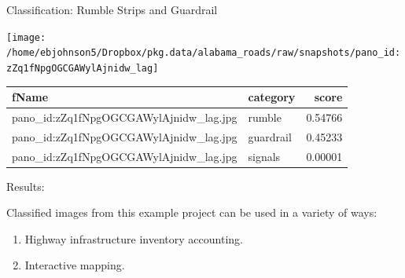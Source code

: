 \documentclass[ignorenonframetext,]{beamer}
\providecommand{\tightlist}{%
  \setlength{\itemsep}{0pt}\setlength{\parskip}{0pt}}
\begin{document}
\begin{frame}{Classification: Rumble Strips and Guardrail}

\begin{center}\texttt{[image: /home/ebjohnson5/Dropbox/pkg.data/alabama\_roads/raw/snapshots/pano\_id:zZq1fNpgOGCGAWylAjnidw\_lag]} \end{center}

\begin{table}[H]
\centering\begingroup\fontsize{6}{8}\selectfont

\begin{tabular}{l|l|r}
\hline
fName & category & score\\
\hline
pano\_id:zZq1fNpgOGCGAWylAjnidw\_lag.jpg & rumble & 0.54766\\
\hline
pano\_id:zZq1fNpgOGCGAWylAjnidw\_lag.jpg & guardrail & 0.45233\\
\hline
pano\_id:zZq1fNpgOGCGAWylAjnidw\_lag.jpg & signals & 0.00001\\
\hline
\end{tabular}\endgroup{}
\end{table}

\end{frame}

\begin{frame}{Results:}

Classified images from this example project can be used in a variety of
ways:

\begin{enumerate}
\def\labelenumi{\arabic{enumi}.}
\tightlist
\item
  Highway infrastructure inventory accounting.
\item
  Interactive mapping.
\end{enumerate}

\end{frame}
\end{document}

